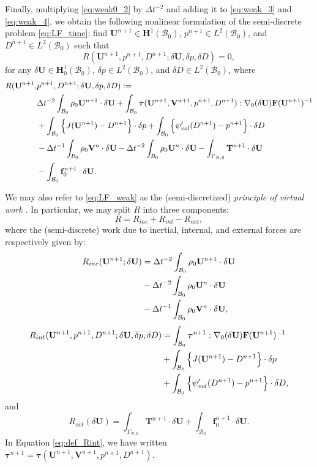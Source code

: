 \documentclass{sfuthesis}
\numberwithin{equation}{section}
\numberwithin{figure}{chapter}
\numberwithin{table}{chapter}
\theoremstyle{definition}
\def\*#1{{\mathbf{#1}}} %
\newcommand{\B}{\mathcal{B}}
\def\btau{{\bm{\tau}}}
\begin{document}
Finally, multiplying \eqref{eq:weak0_2} by $\Delta t^{-2}$ and adding it to \eqref{eq:weak_3} and \eqref{eq:weak_4}, we obtain the following nonlinear formulation of the semi-discrete problem \eqref{eq:LF_time}: find $\*U^{n+1} \in \*H^1(\B_0)$, $p^{n+1} \in L^2(\B_0)$, and $D^{n+1} \in L^2(\B_0)$ such that
\begin{equation} \label{eq:LF_weak}
    R(\*U^{n+1},p^{n+1},D^{n+1} ; \delta\*U, \delta p, \delta D) = 0,
\end{equation}
for any $\delta\*U \in \*H_0^1(\B_0)$, $\delta p \in L^2(\B_0)$, and $\delta D \in L^2(\B_0)$, where
\begin{align} \label{eq:def_R_LF}
    \notag R(\*U^{n+1},&p^{n+1},D^{n+1} ; \delta\*U, \delta p, \delta D) := \\
    \notag &\Delta t^{-2} \int_{\B_0} \rho_0 \*U^{n+1} \cdot \delta\*U + \int_{\B_0} \btau(\*U^{n+1},\*V^{n+1}, p^{n+1}, D^{n+1}) : \nabla_0(\delta\*U) \*F(\*U^{n+1})^{-1} \\
    \notag &+ \int_{\B_0} \Big\{ J(\*U^{n+1}) - D^{n+1} \Big\} \cdot \delta p + \int_{\B_0} \Big\{ \psi'_{vol}(D^{n+1}) - p^{n+1} \Big\} \cdot \delta D \\
    \notag &- \Delta t^{-1} \int_{\B_0} \rho_0 \*V^n \cdot \delta\*U - \Delta t^{-2} \int_{\B_0} \rho_0 \*U^n \cdot \delta \*U - \int_{\Gamma_{N,0}} \*T^{n+1} \cdot \delta\*U \\
    &- \int_{\B_0} \*f_0^{n+1} \cdot \delta \*U.
\end{align}

We may also refer to \eqref{eq:LF_weak} as the (semi-discretized) \textit{principle of virtual work} \cite{HolzapfelBook}. In particular, we may split $R$ into three components:
\begin{equation}
    R = R_{ine} + R_{int} - R_{ext},
\end{equation}
where the (semi-discrete) work due to inertial, internal, and external forces are respectively given by:
\begin{align}
    \notag R_{ine}(\*U^{n+1} ; \delta\*U) &= \Delta t^{-2} \int_{\B_0} \rho_0 \*U^{n+1} \cdot \delta\*U \\
    \notag &- \Delta t^{-2} \int_{\B_0} \rho_0 \*U^n \cdot \delta\*U \\
    \label{eq:def_Rine}&- \Delta t^{-1} \int_{\B_0} \rho_0 \*V^n \cdot \delta\*U,
\end{align}
\begin{align}
    \notag R_{int}(\*U^{n+1}, p^{n+1}, D^{n+1} ; \delta\*U, \delta p, \delta D) &= \int_{\B_0} \btau^{n+1} : \nabla_0(\delta\*U) \*F(\*U^{n+1})^{-1} \\
    \notag &+ \int_{\B_0} \Big\{ J(\*U^{n+1}) - D^{n+1} \Big\} \cdot \delta p \\
    \label{eq:def_Rint}&+ \int_{\B_0} \Big\{ \psi'_{vol}(D^{n+1}) - p^{n+1} \Big\} \cdot \delta D,
\end{align}
and
\begin{equation}
    \label{eq:def_Rext}R_{ext}(\delta \*U) =  \int_{\Gamma_{N,0}} \*T^{n+1} \cdot \delta\*U + \int_{\B_0} \*f_0^{n+1}  \cdot \delta\*U.
\end{equation}
In Equation \eqref{eq:def_Rint}, we have written $\btau^{n+1} = \btau(\*U^{n+1},\*V^{n+1}, p^{n+1}, D^{n+1})$.
\end{document}
